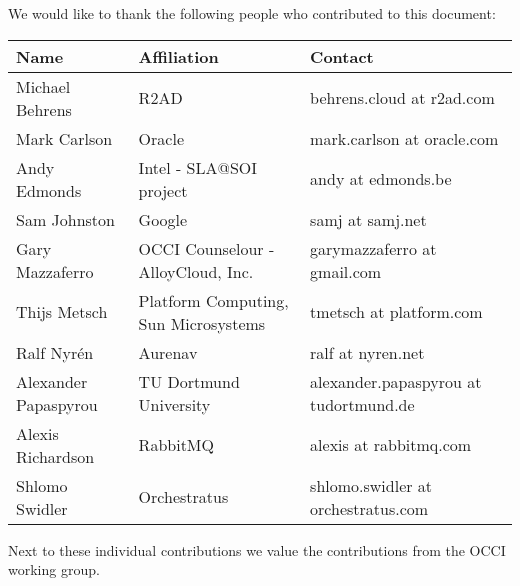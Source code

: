 
We would like to thank the following people who contributed to this
document:

\begin{tabular}{l|p{2in}|p{2in}}
Name & Affiliation & Contact \\
\hline
Michael Behrens & R2AD & behrens.cloud at r2ad.com \\
Mark Carlson & Oracle & mark.carlson at oracle.com \\
Andy Edmonds & Intel - SLA@SOI project & andy at edmonds.be \\
Sam Johnston & Google & samj at samj.net \\
Gary Mazzaferro & OCCI Counselour - AlloyCloud, Inc. &  garymazzaferro at gmail.com \\ 
Thijs Metsch & Platform Computing, Sun Microsystems & tmetsch at platform.com \\
Ralf Nyrén & Aurenav & ralf at nyren.net \\
Alexander Papaspyrou & TU Dortmund University & alexander.papaspyrou at tu\-dortmund.de \\
Alexis Richardson & RabbitMQ & alexis at rabbitmq.com \\
Shlomo Swidler & Orchestratus & shlomo.swidler at orchestratus.com \\
\end{tabular}

Next to these individual contributions we value the contributions from
the OCCI working group.
